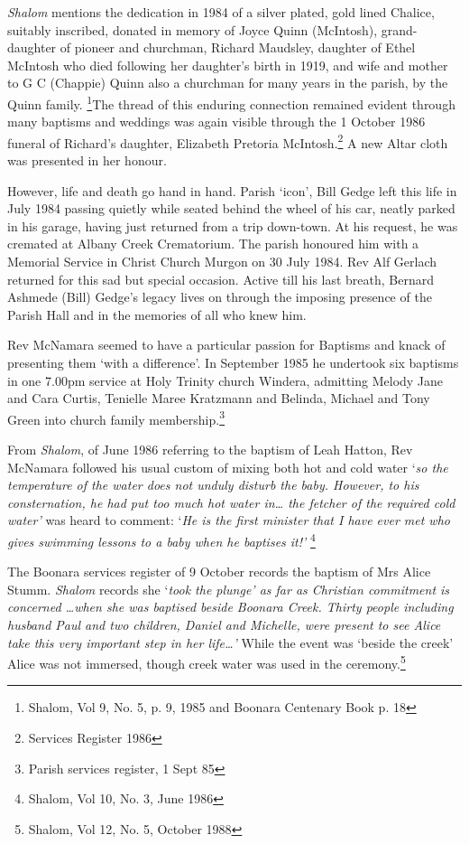 \emph{Shalom} mentions the dedication in 1984 of a silver plated, gold
lined Chalice, suitably inscribed, donated in memory of Joyce Quinn
(McIntosh), grand-daughter of pioneer and churchman, Richard Maudsley,
daughter of Ethel McIntosh who died following her daughter's birth in
1919, and wife and mother to G C (Chappie) Quinn also a churchman for
many years in the parish, by the Quinn family. \footnote{Shalom, Vol 9,
  No. 5, p. 9, 1985 and Boonara Centenary Book p. 18}The thread of this
enduring connection remained evident through many baptisms and weddings
was again visible through the 1 October 1986 funeral of Richard's
daughter, Elizabeth Pretoria McIntosh.\footnote{Services Register 1986}
A new Altar cloth was presented in her honour.

However, life and death go hand in hand. Parish `icon', Bill Gedge left
this life in July 1984 passing quietly while seated behind the wheel of
his car, neatly parked in his garage, having just returned from a trip
down-town. At his request, he was cremated at Albany Creek Crematorium.
The parish honoured him with a Memorial Service in Christ Church Murgon
on 30 July 1984. Rev Alf Gerlach returned for this sad but special
occasion. Active till his last breath, Bernard Ashmede (Bill) Gedge's
legacy lives on through the imposing presence of the Parish Hall and in
the memories of all who knew him.

Rev McNamara seemed to have a particular passion for Baptisms and knack
of presenting them `with a difference'. In September 1985 he undertook
six baptisms in one 7.00pm service at Holy Trinity church Windera,
admitting Melody Jane and Cara Curtis, Tenielle Maree Kratzmann and
Belinda, Michael and Tony Green into church family
membership.\footnote{Parish services register, 1 Sept 85}

From \emph{Shalom}, of June 1986 referring to the baptism of Leah
Hatton, Rev McNamara followed his usual custom of mixing both hot and
cold water `\emph{so the temperature of the water does not unduly
disturb the baby. However, to his consternation, he had put too much hot
water in\ldots{} the fetcher of the required cold water'} was heard to
comment: `\emph{He is the first minister that I have ever met who gives
swimming lessons to a baby when he baptises it!'} \footnote{Shalom, Vol
  10, No. 3, June 1986}

The Boonara services register of 9 October records the baptism of Mrs
Alice Stumm. \emph{Shalom} records she `\emph{took the plunge' as far as
Christian commitment is concerned \ldots when she was baptised beside
Boonara Creek. Thirty people including husband Paul and two children,
Daniel and Michelle, were present to see Alice take this very important
step in her life\ldots'} While the event was `beside the creek' Alice
was not immersed, though creek water was used in the
ceremony.\footnote{Shalom, Vol 12, No. 5, October 1988}

